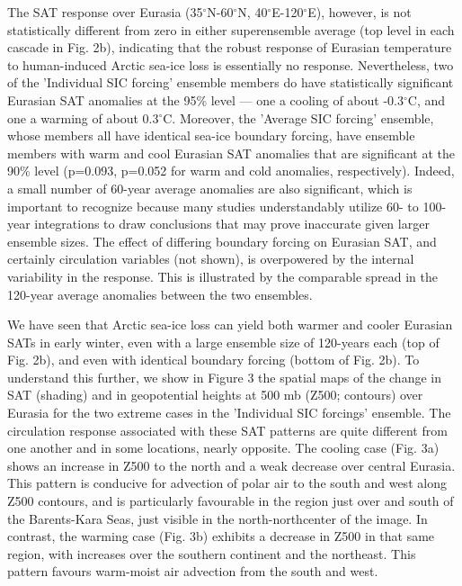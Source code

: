 \documentclass[grl]{AGUTeX}  %
\begin{document}
\begin{article}
The SAT response over Eurasia (35$^\circ$N-60$^\circ$N, 40$^\circ$E-120$^\circ$E), however, is not statistically different from zero in either superensemble average (top level in each cascade in Fig. 2b), indicating that the robust response of Eurasian temperature to human-induced Arctic sea-ice loss is essentially no response. Nevertheless, two of the 'Individual SIC forcing' ensemble members do have statistically significant Eurasian SAT anomalies at the 95\% level --- one a cooling of about -0.3$^\circ$C, and one a warming of about 0.3$^\circ$C. Moreover, the 'Average SIC forcing' ensemble, whose members all have identical sea-ice boundary forcing, have ensemble members with warm and cool Eurasian SAT anomalies that are significant at the 90\% level (p=0.093, p=0.052 for warm and cold anomalies, respectively). Indeed, a small number of 60-year average anomalies are also significant, which is important to recognize because many studies understandably utilize 60- to 100-year integrations to draw conclusions that may prove inaccurate given larger ensemble sizes. The effect of differing boundary forcing on Eurasian SAT, and certainly circulation variables (not shown), is overpowered by the internal variability in the response. This is illustrated by the comparable spread in the 120-year average anomalies between the two ensembles. %

We have seen that Arctic sea-ice loss can yield both warmer and cooler Eurasian SATs in early winter, even with a large ensemble size of 120-years each (top of Fig. 2b), and even with identical boundary forcing (bottom of Fig. 2b). To understand this further, we show in Figure 3 the spatial maps of the change in SAT (shading) and in geopotential heights at 500 mb (Z500; contours) over Eurasia for the two extreme cases in the 'Individual SIC forcings' ensemble. The circulation response associated with these SAT patterns are quite different from one another and in some locations, nearly opposite. The cooling case (Fig. 3a) shows an increase in Z500 to the north and a weak decrease over central Eurasia. This pattern is conducive for advection of polar air to the south and west along Z500 contours, and is particularly favourable in the region just over and south of the Barents-Kara Seas, just visible in the north-northcenter of the image. In contrast, the warming case (Fig. 3b) exhibits a decrease in Z500 in that same region, with increases over the southern continent and the northeast. This pattern favours warm-moist air advection from the south and west. %


\end{article}
\end{document}
